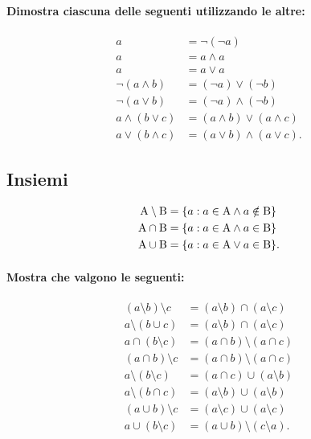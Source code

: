 \documentclass{article}
\begin{document}
\paragraph{Dimostra ciascuna delle seguenti utilizzando le altre:}

\begin{align*}
a &= \lnot (\lnot a)\\
a &= a \land a\\
a &= a \lor a\\
\lnot (a \land b) &= (\lnot a) \lor (\lnot b)\\
\lnot (a \lor b) &= (\lnot a) \land (\lnot b)\\
a \land (b \lor c) &= (a \land b) \lor (a \land c)\\
a \lor (b \land c) &= (a \lor b) \land (a \lor c).
\end{align*}

\subsection*{Insiemi}

\begin{align*}
{\rm A} \setminus {\rm B} &= \{a: a \in {\rm A} \land a \notin {\rm B}\}\\
{\rm A} \cap {\rm B} &= \{a: a \in {\rm A} \land a \in {\rm B}\}\\
{\rm A} \cup {\rm B} &= \{a: a \in {\rm A} \lor a \in {\rm B}\}.
\end{align*}

\paragraph{Mostra che valgono le seguenti:}

\begin{align*}
(a \setminus b) \setminus c &= (a \setminus b) \cap (a \setminus c)\\
a \setminus (b \cup c) &= (a \setminus b) \cap (a \setminus c)\\
a \cap (b \setminus c) &= (a \cap b) \setminus (a \cap c)\\
(a \cap b) \setminus c &= (a \cap b) \setminus (a \cap c)\\
a \setminus (b \setminus c) &= (a \cap c) \cup (a \setminus b)\\
a \setminus (b \cap c) &= (a \setminus b) \cup (a \setminus b)\\
(a \cup b) \setminus c &= (a \setminus c) \cup (a \setminus c)\\
a \cup (b \setminus c) &= (a \cup b) \setminus (c \setminus a).
\end{align*}
\end{document}
